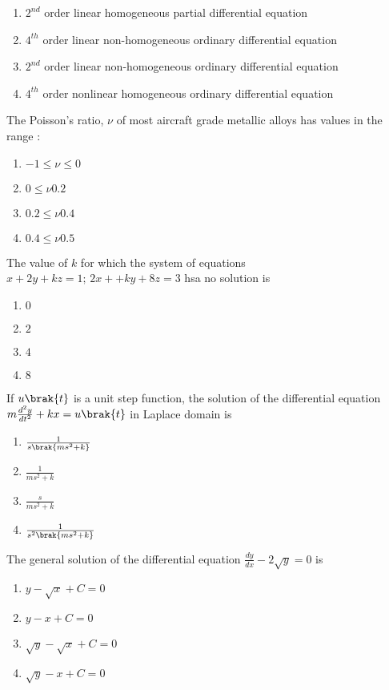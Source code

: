     \begin{enumerate}
        \item $2^{nd}$ order linear homogeneous partial differential equation
        \item $4^{th}$ order linear non-homogeneous ordinary differential equation
        \item $2^{nd}$ order linear non-homogeneous ordinary differential equation
        \item $4^{th}$ order nonlinear homogeneous ordinary differential equation
    \end{enumerate}
    \item The Poisson's ratio, $\nu$ of most aircraft grade metallic alloys has values in the range $\colon$
    \begin{enumerate}
        \item $-1\leq\nu\leq0$
        \item $0\leq\nu0.2$
        \item $0.2\leq\nu0.4$
        \item $0.4\leq\nu0.5$
    \end{enumerate}
    \item The value of $k$ for which the system of equations $x+2y+kz=1;\,2x++ky+8z=3$ hsa no solution is
        \begin{enumerate}
            \item $0$
            \item $2$
            \item $4$
            \item $8$
        \end{enumerate}
    \item If $u\brak{t}$ is a unit step function, the solution of the differential equation $m\frac{d^2y}{dt^2}+kx=u\brak{t}$ in Laplace domain is
            \begin{enumerate}
                \item $\frac{1}{s\brak{ms^2+k}}$
                \item $\frac{1}{ms^2+k}$
                \item $\frac{s}{ms^2+k}$
                \item $\frac{1}{s^2\brak{ms^2+k}}$
            \end{enumerate}
    \item The general solution of the differential equation $\frac{dy}{dx}-2\sqrt{y}=0$ is
    \begin{enumerate}
        \item $y-\sqrt{x}+C=0$
        \item $y-x+C=0$
        \item $\sqrt{y}-\sqrt{x}+C=0$
        \item $\sqrt{y}-x+C=0$
    \end{enumerate}
